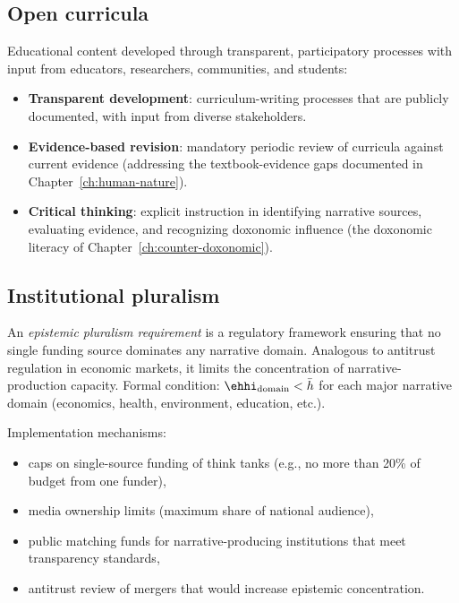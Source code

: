 \subsection{Open curricula}

Educational content developed through transparent, participatory processes with input from educators, researchers, communities, and students:
\begin{itemize}[nosep]
  \item \textbf{Transparent development}: curriculum-writing processes that are publicly documented, with input from diverse stakeholders.
  \item \textbf{Evidence-based revision}: mandatory periodic review of curricula against current evidence (addressing the textbook-evidence gaps documented in Chapter~\ref{ch:human-nature}).
  \item \textbf{Critical thinking}: explicit instruction in identifying narrative sources, evaluating evidence, and recognizing doxonomic influence (the doxonomic literacy of Chapter~\ref{ch:counter-doxonomic}).
\end{itemize}

\subsection{Institutional pluralism}

\begin{definition}
\label{def:pluralism}
An \emph{epistemic pluralism requirement} is a regulatory framework ensuring that no single funding source dominates any narrative domain.
Analogous to antitrust regulation in economic markets, it limits the concentration of narrative-production capacity.
Formal condition: $\ehhi_{\text{domain}} < \bar{h}$ for each major narrative domain (economics, health, environment, education, etc.).
\end{definition}

Implementation mechanisms:
\begin{itemize}[nosep]
  \item caps on single-source funding of think tanks (e.g., no more than 20\% of budget from one funder),
  \item media ownership limits (maximum share of national audience),
  \item public matching funds for narrative-producing institutions that meet transparency standards,
  \item antitrust review of mergers that would increase epistemic concentration.
\end{itemize}

